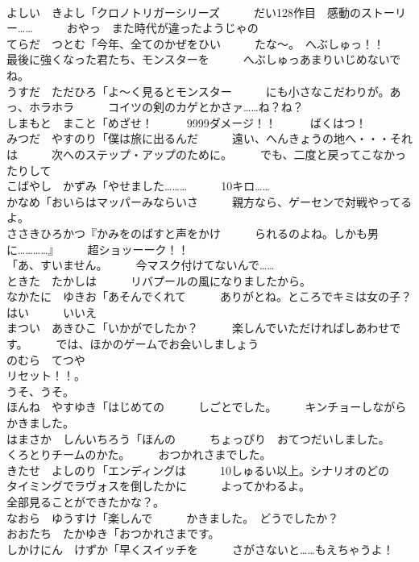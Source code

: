 \documentclass[8pt]{extreport}
\begin{document}
\begin{CJK}{UTF8}{min}
\\	よしい　きよし「クロノトリガーシリーズ　　　だい128作目　感動のストーリー……　　　おやっ　また時代が違ったようじゃの	
\\	てらだ　つとむ「今年、全てのかぜをひい　　　たな～。　へぶしゅっ！！　　　最後に強くなった君たち、モンスターを　　　へぶしゅっあまりいじめないでね。	
\\	うすだ　ただひろ「よ～く見るとモンスター　　　にも小さなこだわりが。あっ、ホラホラ　　　コイツの剣のカゲとかさァ……ね？ね？	
\\	しまもと　まこと「めざせ！　　　9999ダメージ！！　　　ばくはつ！	
\\	みつだ　やすのり「僕は旅に出るんだ　　　遠い、へんきょうの地へ・・・それは　　　次へのステップ・アップのために。　　　でも、二度と戻ってこなかったりして	
\\	こばやし　かずみ「やせました………　　　10キロ……	
\\	かなめ「おいらはマッパーみならいさ　　　親方なら、ゲーセンで対戦やってるよ。	
\\	ささきひろかつ『かみをのばすと声をかけ　　　られるのよね。しかも男に…………』　　　超ショッーーク！！	
\\	「あ、すいません。　　　今マスク付けてないんで……	
\\	ときた　たかしは　　　リバプールの風になりましたから。	
\\	なかたに　ゆきお「あそんでくれて　　　ありがとね。ところでキミは女の子？　　　はい　　　いいえ	
\\	まつい　あきひこ「いかがでしたか？　　　楽しんでいただければしあわせです。　　　では、ほかのゲームでお会いしましょう	
\\	のむら　てつや
\\	リセット！！。	
\\	うそ、うそ。	
\\	ほんね　やすゆき「はじめての　　　しごとでした。　　　キンチョーしながらかきました。	
\\	はまさか　しんいちろう「ほんの　　　ちょっぴり　おてつだいしました。　　　くろとりチームのかた。　　　おつかれさまでした。	
\\	きたせ　よしのり「エンディングは　　　10しゅるい以上。シナリオのどの　　　タイミングでラヴォスを倒したかに　　　よってかわるよ。	
\\	全部見ることができたかな？。	
\\	なおら　ゆうすけ「楽しんで　　　かきました。　どうでしたか？	
\\	おおたち　たかゆき「おつかれさまです。	
\\	しかけにん　けずか「早くスイッチを　　　さがさないと……もえちゃうよ！	

\end{CJK}
\end{document}
